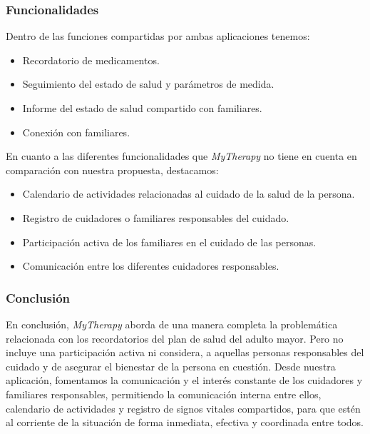 \documentclass[a4paper,12pt]{article}
\begin{document}
    \subsubsection{Funcionalidades}
    Dentro de las funciones compartidas por ambas aplicaciones tenemos:
    \begin{itemize}
        \item Recordatorio de medicamentos.
        \item Seguimiento del estado de salud y parámetros de medida.
        \item Informe del estado de salud compartido con familiares.
        \item Conexión con familiares.
    \end{itemize}
    En cuanto a las diferentes funcionalidades que \textit{MyTherapy} no tiene en cuenta en comparación con nuestra propuesta, destacamos:
    \begin{itemize}
        \item Calendario de actividades relacionadas al cuidado de la salud de la persona.
        \item Registro de cuidadores o familiares responsables del cuidado.
        \item Participación activa de los familiares en el cuidado de las personas.
        \item Comunicación entre los diferentes cuidadores responsables.        
    \end{itemize}
    \subsubsection{Conclusión}
    En conclusión, \textit{MyTherapy} aborda de una manera completa la problemática relacionada con los recordatorios del plan de salud del adulto mayor. Pero no incluye una participación activa ni considera, a aquellas personas responsables del cuidado y de asegurar el bienestar de la persona en cuestión. Desde nuestra aplicación, fomentamos la comunicación y el interés constante de los cuidadores y familiares responsables, permitiendo la comunicación interna entre ellos, calendario de actividades y registro de signos vitales compartidos, para que estén al corriente de la situación de forma inmediata, efectiva y coordinada entre todos.
\end{document}
